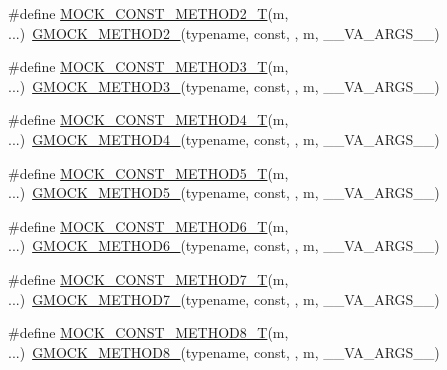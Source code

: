 \begin{DoxyCompactItemize}
\item 
\#define \mbox{\hyperlink{gmock-generated-function-mockers_8h_a4337d7257aa4edff048aa406073b718b}{M\+O\+C\+K\+\_\+\+C\+O\+N\+S\+T\+\_\+\+M\+E\+T\+H\+O\+D2\+\_\+T}}(m, ...)~\mbox{\hyperlink{gmock-generated-function-mockers_8h_a885295ca6bebb15efb3fc786218c5d47}{G\+M\+O\+C\+K\+\_\+\+M\+E\+T\+H\+O\+D2\+\_\+}}(typename, const, , m, \+\_\+\+\_\+\+V\+A\+\_\+\+A\+R\+G\+S\+\_\+\+\_\+)
\item 
\#define \mbox{\hyperlink{gmock-generated-function-mockers_8h_a4c4c3417c197729f647fb0c700a41405}{M\+O\+C\+K\+\_\+\+C\+O\+N\+S\+T\+\_\+\+M\+E\+T\+H\+O\+D3\+\_\+T}}(m, ...)~\mbox{\hyperlink{gmock-generated-function-mockers_8h_af7c77ba511c631de02bb8c45a6ed3045}{G\+M\+O\+C\+K\+\_\+\+M\+E\+T\+H\+O\+D3\+\_\+}}(typename, const, , m, \+\_\+\+\_\+\+V\+A\+\_\+\+A\+R\+G\+S\+\_\+\+\_\+)
\item 
\#define \mbox{\hyperlink{gmock-generated-function-mockers_8h_a52290b1b841869d2d624b60ba1b6c3c4}{M\+O\+C\+K\+\_\+\+C\+O\+N\+S\+T\+\_\+\+M\+E\+T\+H\+O\+D4\+\_\+T}}(m, ...)~\mbox{\hyperlink{gmock-generated-function-mockers_8h_ab6430f2cfad9de4aca5258ea559294bb}{G\+M\+O\+C\+K\+\_\+\+M\+E\+T\+H\+O\+D4\+\_\+}}(typename, const, , m, \+\_\+\+\_\+\+V\+A\+\_\+\+A\+R\+G\+S\+\_\+\+\_\+)
\item 
\#define \mbox{\hyperlink{gmock-generated-function-mockers_8h_a37d02091cf2e4d31c11f38609d12a815}{M\+O\+C\+K\+\_\+\+C\+O\+N\+S\+T\+\_\+\+M\+E\+T\+H\+O\+D5\+\_\+T}}(m, ...)~\mbox{\hyperlink{gmock-generated-function-mockers_8h_a9e3ecd392499ab19a4a6d3adcabf56f6}{G\+M\+O\+C\+K\+\_\+\+M\+E\+T\+H\+O\+D5\+\_\+}}(typename, const, , m, \+\_\+\+\_\+\+V\+A\+\_\+\+A\+R\+G\+S\+\_\+\+\_\+)
\item 
\#define \mbox{\hyperlink{gmock-generated-function-mockers_8h_a18f8d1d9ac6c6684bd681342e130662b}{M\+O\+C\+K\+\_\+\+C\+O\+N\+S\+T\+\_\+\+M\+E\+T\+H\+O\+D6\+\_\+T}}(m, ...)~\mbox{\hyperlink{gmock-generated-function-mockers_8h_ad0ca7f6973a076d0af4c953f8ed91842}{G\+M\+O\+C\+K\+\_\+\+M\+E\+T\+H\+O\+D6\+\_\+}}(typename, const, , m, \+\_\+\+\_\+\+V\+A\+\_\+\+A\+R\+G\+S\+\_\+\+\_\+)
\item 
\#define \mbox{\hyperlink{gmock-generated-function-mockers_8h_a6e9ae85c17b12ba8882e06b3785d4582}{M\+O\+C\+K\+\_\+\+C\+O\+N\+S\+T\+\_\+\+M\+E\+T\+H\+O\+D7\+\_\+T}}(m, ...)~\mbox{\hyperlink{gmock-generated-function-mockers_8h_ab98a8399ba62b53b375c2807f4d39d2f}{G\+M\+O\+C\+K\+\_\+\+M\+E\+T\+H\+O\+D7\+\_\+}}(typename, const, , m, \+\_\+\+\_\+\+V\+A\+\_\+\+A\+R\+G\+S\+\_\+\+\_\+)
\item 
\#define \mbox{\hyperlink{gmock-generated-function-mockers_8h_a430c2eae077074190d4b380868d42944}{M\+O\+C\+K\+\_\+\+C\+O\+N\+S\+T\+\_\+\+M\+E\+T\+H\+O\+D8\+\_\+T}}(m, ...)~\mbox{\hyperlink{gmock-generated-function-mockers_8h_aa84a36427c44505207b7cad5dec7ad67}{G\+M\+O\+C\+K\+\_\+\+M\+E\+T\+H\+O\+D8\+\_\+}}(typename, const, , m, \+\_\+\+\_\+\+V\+A\+\_\+\+A\+R\+G\+S\+\_\+\+\_\+)

\end{DoxyCompactItemize}
